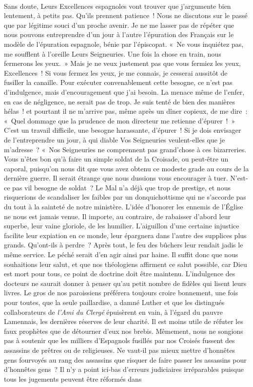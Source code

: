 \documentclass[french,twoside]{book} %
\newcommand{\astertri}{\medskip\par\centerline{\color{rubric}\large\selectfont{\syms ✻\,✻\,✻}}\medskip\par}%
\begin{document}
\astertri

\noindent  \par
Sans doute, Leurs Excellences espagnoles vont trouver que j’argumente bien lentement, à petits pas. Qu’ils prennent patience ! Nous ne discutons sur le passé que par légitime souci d’un proche avenir. Je ne me lasser pas de répéter que nous pouvons entreprendre d’un jour à l’autre l’épuration des Français sur le modèle de l’épuration espagnole, bénie par l’épiscopat. « Ne vous inquiétez pas, me soufflent à l’oreille Leurs Seigneuries. Une fois la chose en train, nous fermerons les yeux. » Mais je ne veux justement pas que vous fermiez les yeux, Excellences ! Si vous fermez les yeux, je me connais, je cesserai aussitôt de fusiller la canaille. Pour exécuter convenablement cette besogne, ce n’est pas d’indulgence, mais d’encouragement que j’ai besoin. La menace même de l’enfer, en cas de négligence, ne serait pas de trop. Je suis tenté de bien des manières hélas ! et pourtant il ne m’arrive pas, même après un dîner copieux, de me dire : « Quel dommage que la prudence de mon directeur me retienne d’épurer ! » C’est un travail difficile, une besogne harassante, d’épurer ! Si je dois envisager de l’entreprendre un jour, à qui diable Vos Seigneuries veulent-elles que je m’adresse ? « Nos Seigneuries ne comprennent pas grand’chose à ces bizarreries. Vous n’êtes bon qu’à faire un simple soldat de la Croisade, ou peut-être un caporal, puisqu’on nous dit que vous avez obtenu ce modeste grade au cours de la dernière guerre. Il serait étrange que nous dussions vous encourager à tuer. N’est-ce pas vil besogne de soldat ? Le Mal n’a déjà que trop de prestige, et nous risquerions de scandaliser les faibles par un donquichottisme qui ne s’accorde pas du tout à la sainteté de notre ministère. L’idée d’honorer les ennemis de l’Église ne nous est jamais venue. Il importe, au contraire, de rabaisser d’abord leur superbe, leur vaine gloriole, de les humilier. L’aiguillon d’une certaine injustice facilite leur expiation en ce monde, leur épargnera dans l’autre des supplices plus grands. Qu’ont-ils à perdre ? Après tout, le feu des bûchers leur rendait jadis le même service. Le péché serait d’en agir ainsi par haine. Il suffit donc que nous souhaitions leur salut, et que nos théologiens affirment ce salut possible, car Dieu est mort pour tous, ce point de doctrine doit être maintenu. L’indulgence des docteurs ne saurait donner à penser qu’au petit nombre de fidèles qui lisent leurs livres. Le gros de nos paroissiens préférera toujours croire bonnement, une fois pour toutes, que la seule paillardise, a damné Luther et que les distingués collaborateurs de \emph{l’Ami du Clergé} épuisèrent en vain, à l’égard du pauvre Lamennais, les dernières réserves de leur charité. Il est moins utile de réfuter les faux prophètes que de détourner d’eux nos brebis. Mêmement, nous ne songions pas à soutenir que les milliers d’Espagnols fusillés par nos Croisés fussent des assassins de prêtres ou de religieuses. Ne vaut-il pas mieux mettre d’honnêtes gens fourvoyés au rang des assassins que risquer de faire passer les assassins pour d’honnêtes gens ? Il n’y a point ici-bas d’erreurs judiciaires irréparables puisque tous les jugements peuvent être réformés dans 
\end{document}
